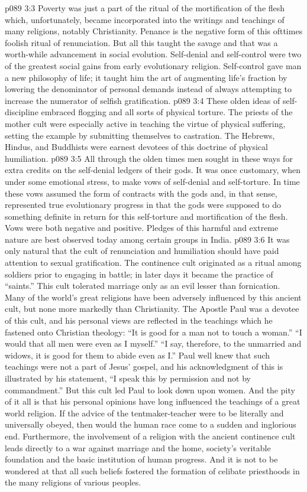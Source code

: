 \vs p089 3:3 Poverty was just a part of the ritual of the mortification of the flesh which, unfortunately, became incorporated into the writings and teachings of many religions, notably Christianity. Penance is the negative form of this ofttimes foolish ritual of renunciation. But all this taught the savage  and that was a worth\hyp{}while advancement in social evolution. Self\hyp{}denial and self\hyp{}control were two of the greatest social gains from early evolutionary religion. Self\hyp{}control gave man a new philosophy of life; it taught him the art of augmenting life’s fraction by lowering the denominator of personal demands instead of always attempting to increase the numerator of selfish gratification.
\vs p089 3:4 These olden ideas of self\hyp{}discipline embraced flogging and all sorts of physical torture. The priests of the mother cult were especially active in teaching the virtue of physical suffering, setting the example by submitting themselves to castration. The Hebrews, Hindus, and Buddhists were earnest devotees of this doctrine of physical humiliation.
\vs p089 3:5 All through the olden times men sought in these ways for extra credits on the self\hyp{}denial ledgers of their gods. It was once customary, when under some emotional stress, to make vows of self\hyp{}denial and self\hyp{}torture. In time these vows assumed the form of contracts with the gods and, in that sense, represented true evolutionary progress in that the gods were supposed to do something definite in return for this self\hyp{}torture and mortification of the flesh. Vows were both negative and positive. Pledges of this harmful and extreme nature are best observed today among certain groups in India.
\vs p089 3:6 \pc It was only natural that the cult of renunciation and humiliation should have paid attention to sexual gratification. The continence cult originated as a ritual among soldiers prior to engaging in battle; in later days it became the practice of “saints.” This cult tolerated marriage only as an evil lesser than fornication. Many of the world’s great religions have been adversely influenced by this ancient cult, but none more markedly than Christianity. The Apostle Paul was a devotee of this cult, and his personal views are reflected in the teachings which he fastened onto Christian theology: “It is good for a man not to touch a woman.” “I would that all men were even as I myself.” “I say, therefore, to the unmarried and widows, it is good for them to abide even as I.” Paul well knew that such teachings were not a part of Jesus’ gospel, and his acknowledgment of this is illustrated by his statement, “I speak this by permission and not by commandment.” But this cult led Paul to look down upon women. And the pity of it all is that his personal opinions have long influenced the teachings of a great world religion. If the advice of the tentmaker\hyp{}teacher were to be literally and universally obeyed, then would the human race come to a sudden and inglorious end. Furthermore, the involvement of a religion with the ancient continence cult leads directly to a war against marriage and the home, society’s veritable foundation and the basic institution of human progress. And it is not to be wondered at that all such beliefs fostered the formation of celibate priesthoods in the many religions of various peoples.
